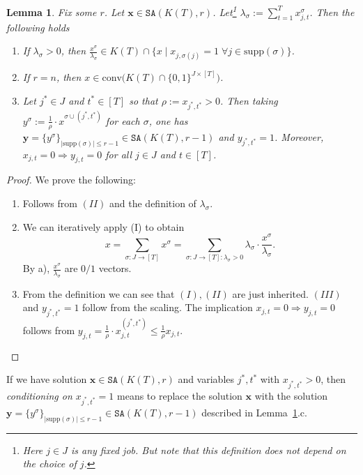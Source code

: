 \documentclass[11pt,letterpaper,oneside,english]{article}
\theoremstyle{theorem}
\newtheorem{lemma}[theorem]{Lemma}
\begin{document}
\begin{lemma}\label{lem:HierarchyProperties}
Fix some $r$. Let $\bm{x} \in
\texttt{SA}(K(T),r)$. Let\footnote{Here $j \in J$ is any fixed job. But note that this definition does not depend on
the choice of $j$.} $\lambda_{\sigma} := \sum_{t=1}^T
x_{j,t}^{\sigma}$. Then the following holds
\begin{enumerate}
\item[a)]  If $\lambda_{\sigma}>0$, then
$\frac{x^{\sigma}}{\lambda_{\sigma}} \in K(T) \cap \{ x \mid
x_{j,\sigma(j)} = 1 \; \forall j \in \textrm{supp}(\sigma)\}$.
\item[b)] If $r=n$, then 
$x \in \textrm{conv}\big(K(T) \cap \{
0,1\}^{J \times [T]}\big)$.
\item[c)] Let $j^* \in J$ and $t^* \in [T]$ so that $\rho :=
x_{j^*,t^*}>0$.
Then taking $y^{\sigma} := \frac{1}{\rho} \cdot x^{\sigma \cup (j^*,t^*)}$ for each $\sigma$, one
has $\bm{y}= \{y^{\sigma}\}_{|\textrm{supp}(\sigma)| \leq r-1} \in \texttt{SA}(K(T),r-1)$ and $y_{j^*,t^*} = 1$.
Moreover,  $x_{j,t} = 0 \Rightarrow y_{j,t}= 0$ for all $j \in J$ and $t \in [T]$.
\end{enumerate}
\end{lemma}

\begin{proof}
We prove the following:
\begin{enumerate}
\item[a)] Follows from $(II)$ and the definition of $\lambda_{\sigma}$.
\item[b)] We can iteratively apply (I) to obtain 
\[
x =
\sum_{\sigma: J \to [T]} x^{\sigma} = \sum_{\sigma: J \to [T]:
\lambda_{\sigma} >0} \lambda_{\sigma} \cdot
\frac{x^{\sigma}}{\lambda_{\sigma}}.
\] 
By a),
$\frac{x^{\sigma}}{\lambda_{\sigma}}$ are $0/1$ vectors.
\item[c)] From the definition we can see that $(I),(II)$ are just
inherited. $(III)$ and $y_{j^*,t^*} = 1$
follow from the scaling. The implication $x_{j,t} = 0
\Rightarrow y_{j,t}= 0$
follows from $y_{j,t} = \frac{1}{\rho} \cdot
x^{(j^*,t^*)}_{j,t} \leq \frac{1}{\rho} x_{j,t}$.
\end{enumerate}
\end{proof}
If we have solution $\bm{x} \in \texttt{SA}(K(T),r)$
and variables $j^*, t^*$ with $x_{j^*,t^*}>0$, then \emph{conditioning on $x_{j^*,t^*}=1$} means to replace the solution $\bm{x} $ with the solution 
$\bm{y} = \{ y^{\sigma}\}_{|\textrm{supp}(\sigma)| \leq r-1} \in \texttt{SA}(K(T),r-1)$ described in Lemma~\ref{lem:HierarchyProperties}.c.
\end{document}
